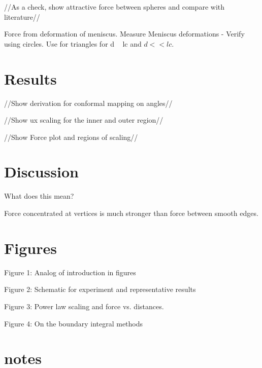 \documentclass[twocolumn,prl]{revtex4-1}
\begin{document}
//As a check, show attractive force between spheres and compare with literature//

Force from deformation of meniscus. Measure Meniscus deformations - Verify using circles. Use for triangles for d ~ lc and $d << lc$.

\section{Results}
//Show derivation for conformal mapping on angles//

//Show ux scaling for the inner and outer region//

//Show Force plot and regions of scaling//

\section{Discussion}
What does this mean?

Force concentrated at vertices is much stronger than force between smooth edges.

\section{Figures}
Figure 1: Analog of introduction in figures

Figure 2: Schematic for experiment and representative results 

Figure 3: Power law scaling and force vs. distances.

Figure 4: On the boundary integral methods

\section{notes}




\end{document}
